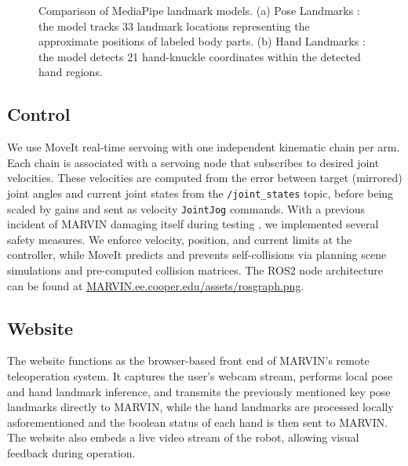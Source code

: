 \documentclass[acmsmall, screen]{acmart}
\begin{document}
\begin{figure}[htbp]
\begin{subfigure}[b]{0.35\linewidth}
  \end{subfigure}
  \caption{Comparison of MediaPipe landmark models. (a) Pose Landmarks \cite{PoseLandmarkDetection}: the model tracks 33 landmark locations representing the approximate positions of labeled body parts. (b) Hand Landmarks \cite{HandLandmarksDetection}: the model detects 21 hand-knuckle coordinates within the detected hand regions.}
  \label{fig:landmarks-comparison}
\end{figure}


\subsection{Control}
We use MoveIt real-time servoing with one independent kinematic chain per arm. Each chain is associated with a servoing node that subscribes to desired joint velocities. These velocities are computed from the error between target (mirrored) joint angles and current joint states from the \texttt{/joint\_states} topic, before being scaled by gains and sent as velocity \texttt{JointJog} commands. With a previous incident of MARVIN damaging itself during testing \cite{rosegebhardtvevoHRI2021Affordable2021}, we implemented several safety measures. We enforce velocity, position, and current limits at the controller, while MoveIt predicts and prevents self-collisions via planning scene simulations and pre-computed collision matrices.
The ROS2 node architecture can be found at \url{MARVIN.ee.cooper.edu/assets/rosgraph.png}.


\subsection{Website}
The website functions as the browser-based front end of MARVIN’s remote teleoperation system. It captures the user’s webcam stream, performs local pose and hand landmark inference, and transmits the previously mentioned key pose landmarks directly to MARVIN, while the hand landmarks are processed locally asforementioned and the boolean status of each hand is then sent to MARVIN. The website also embeds a live video stream of the robot, allowing visual feedback during operation. 
\end{document}

